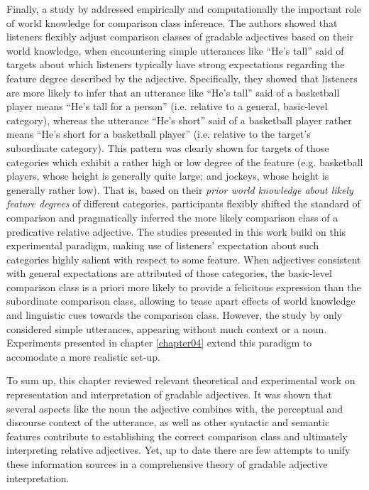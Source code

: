 Finally, a study by \textcite{tessler2017warm} addressed empirically and computationally the important role of world knowledge for comparison class inference. The authors showed that listeners flexibly adjust comparison classes of gradable adjectives based on their world knowledge, when encountering simple utterances like “He’s tall” said of targets about which listeners typically have strong expectations regarding the feature degree described by the adjective. Specifically, they showed that listeners are more likely to infer that an utterance like “He’s tall” said of a basketball player means “He’s tall for a person” (i.e. relative to a general, basic-level category), whereas the utterance “He’s short” said of a basketball player rather means “He’s short for a basketball player” (i.e. relative to the target’s subordinate category). This pattern was clearly shown for targets of those categories which exhibit a rather high or low degree of the feature (e.g. basketball players, whose height is generally quite large; and jockeys, whose height is generally rather low). That is, based on their \emph{prior world knowledge about likely feature degrees} of different categories, participants flexibly shifted the standard of comparison and pragmatically inferred the more likely comparison class of a predicative relative adjective. 
The studies presented in this work build on this experimental paradigm, making use of listeners’ expectation about such categories highly salient with respect to some feature. When adjectives consistent with general expectations are attributed of those categories, the basic-level comparison class is a priori more likely to provide a felicitous expression than the subordinate comparison class, allowing to tease apart effects of world knowledge and linguistic cues towards the comparison class. 
However, the study by \textcite{tessler2017warm} only considered simple utterances, appearing without much context or a noun. Experiments presented in chapter \ref{chapter04} extend this paradigm to accomodate a more realistic set-up. 

To sum up, this chapter reviewed relevant theoretical and experimental work on representation and interpretation of gradable adjectives. It was shown that several aspects like the noun the adjective combines with, the perceptual and discourse context of the utterance, as well as other syntactic and semantic features contribute to establishing the correct comparison class and ultimately interpreting relative adjectives. Yet, up to date there are few attempts to unify these information sources in a comprehensive theory of gradable adjective interpretation.  
